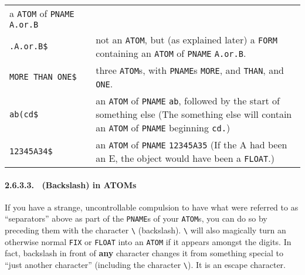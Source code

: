 \documentclass[a4paper,]{article}
\let\oldparagraph\paragraph
\renewcommand{\paragraph}[1]{\oldparagraph{#1}\mbox{}}
\begin{document}
\begin{longtable}[]{@{}ll@{}}
\begin{minipage}[t]{0.67\columnwidth}
a \texttt{ATOM} of \texttt{PNAME} \texttt{A.or.B}\strut
\end{minipage}\tabularnewline
\begin{minipage}[t]{0.27\columnwidth}\raggedright\strut
\texttt{.A.or.B\$}\strut
\end{minipage} & \begin{minipage}[t]{0.67\columnwidth}\raggedright\strut
not an \texttt{ATOM}, but (as explained later) a \texttt{FORM} containing an \texttt{ATOM} of \texttt{PNAME}
\texttt{A.or.B}.\strut
\end{minipage}\tabularnewline
\begin{minipage}[t]{0.27\columnwidth}\raggedright\strut
\texttt{MORE\ THAN\ ONE\$}\strut
\end{minipage} & \begin{minipage}[t]{0.67\columnwidth}\raggedright\strut
three \texttt{ATOM}s, with \texttt{PNAME}s \texttt{MORE}, and \texttt{THAN}, and \texttt{ONE}.\strut
\end{minipage}\tabularnewline
\begin{minipage}[t]{0.27\columnwidth}\raggedright\strut
\texttt{ab(cd\$}\strut
\end{minipage} & \begin{minipage}[t]{0.67\columnwidth}\raggedright\strut
an \texttt{ATOM} of \texttt{PNAME} \texttt{ab}, followed by the start of something else (The something else will contain an
\texttt{ATOM} of \texttt{PNAME} beginning \texttt{cd.})\strut
\end{minipage}\tabularnewline
\begin{minipage}[t]{0.27\columnwidth}\raggedright\strut
\texttt{12345A34\$}\strut
\end{minipage} & \begin{minipage}[t]{0.67\columnwidth}\raggedright\strut
an \texttt{ATOM} of \texttt{PNAME} \texttt{12345A35} (If the A had been an E, the object would have been a
\texttt{FLOAT}.)\strut
\end{minipage}\tabularnewline
\bottomrule
\end{longtable}

\paragraph{2.6.3.3. ~(Backslash) in ATOMs}\label{backslash-in-atoms}

If you have a strange, uncontrollable compulsion to have what were referred to as ``separators'' above as part of the
\texttt{PNAME}s of your \texttt{ATOM}s, you can do so by preceding them with the character
\texttt{\textbackslash{}} (backslash). \texttt{\textbackslash{}} will also
magically turn an otherwise normal \texttt{FIX} or \texttt{FLOAT} into an \texttt{ATOM} if it appears amongst the digits.
In fact, backslash in front of \textbf{any} character changes it from something special to ``just another character''
(including the character \texttt{\textbackslash{}}). It is an escape character.
\end{document}
